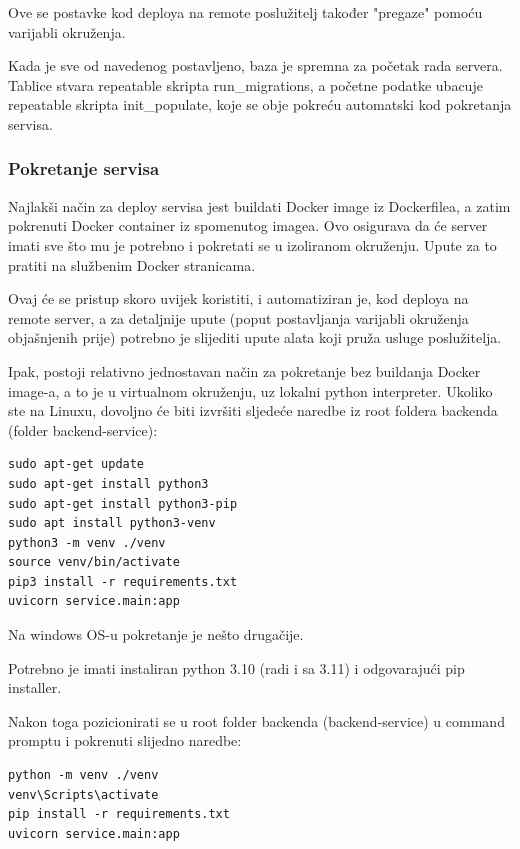 		Ove se postavke kod deploya na remote poslužitelj također "pregaze" pomoću varijabli okruženja.
		
		Kada je sve od navedenog postavljeno, baza je spremna za početak rada servera. Tablice stvara repeatable skripta run\_migrations, a početne podatke ubacuje repeatable skripta init\_populate, koje se obje pokreću automatski kod pokretanja servisa.
		
		\subsubsection{Pokretanje servisa}
		
		Najlakši način za deploy servisa jest buildati Docker image iz Dockerfilea, a zatim pokrenuti Docker container iz spomenutog imagea. Ovo osigurava da će server imati sve što mu je potrebno i pokretati se u izoliranom okruženju. Upute za to pratiti na službenim Docker stranicama.
		
		Ovaj će se pristup skoro uvijek koristiti, i automatiziran je, kod deploya na remote server, a za detaljnije upute (poput postavljanja varijabli okruženja objašnjenih prije) potrebno je slijediti upute alata koji pruža usluge poslužitelja.
		
		Ipak, postoji relativno jednostavan način za pokretanje bez buildanja Docker image-a, a to je u virtualnom okruženju, uz lokalni python interpreter. Ukoliko ste na Linuxu, dovoljno će biti izvršiti sljedeće naredbe iz root foldera backenda (folder backend-service):
		
		\begin{lstlisting}
sudo apt-get update
sudo apt-get install python3
sudo apt-get install python3-pip
sudo apt install python3-venv
python3 -m venv ./venv
source venv/bin/activate
pip3 install -r requirements.txt
uvicorn service.main:app \end{lstlisting}

		Na windows OS-u pokretanje je nešto drugačije.
		
		Potrebno je imati instaliran python 3.10 (radi i sa 3.11) i odgovarajući pip installer.
		
		Nakon toga pozicionirati se u root folder backenda (backend-service) u command promptu i pokrenuti slijedno naredbe:
		
		\begin{lstlisting}
python -m venv ./venv
venv\Scripts\activate
pip install -r requirements.txt
uvicorn service.main:app \end{lstlisting}
		
